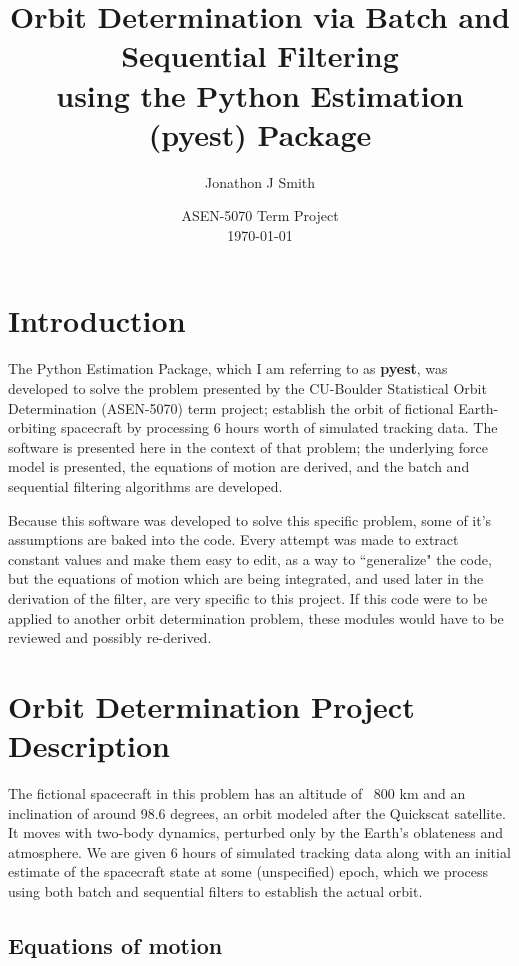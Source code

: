 \documentclass[10pt]{article}
\title{Orbit Determination via Batch and Sequential Filtering\\ using the Python Estimation (pyest) Package\\}
\author{Jonathon J Smith}
\date{ASEN-5070 Term Project \\\today}
\begin{document}
\maketitle
\tableofcontents
\newpage

\section{Introduction}

The Python Estimation Package, which I am referring to as \textbf{pyest}, was developed to solve the problem presented by the CU-Boulder Statistical Orbit Determination (ASEN-5070) term project; establish the orbit of fictional Earth-orbiting spacecraft by processing 6 hours worth of simulated tracking data. The software is presented here in the context of that problem; the underlying force model is presented, the equations of motion are derived, and the batch and sequential filtering algorithms are developed. 

Because this software was developed to solve this specific problem, some of it's assumptions are baked into the code. Every attempt was made to extract constant values and make them easy to edit, as a way to ``generalize" the code, but the equations of motion which are being integrated, and used later in the derivation of the filter, are very specific to this project. If this code were to be applied to another orbit determination problem, these modules would have to be reviewed and possibly re-derived.

\section{Orbit Determination Project Description}

The fictional spacecraft in this problem has an altitude of ~800 km and an inclination of around 98.6 degrees, an orbit modeled after the Quickscat satellite. It moves with two-body dynamics, perturbed only by the Earth's oblateness and atmosphere. We are given 6 hours of simulated tracking data along with an initial estimate of the spacecraft state at some (unspecified) epoch, which we process using both batch and sequential filters to establish the actual orbit.
 
\subsection{Equations of motion}
\end{document}
